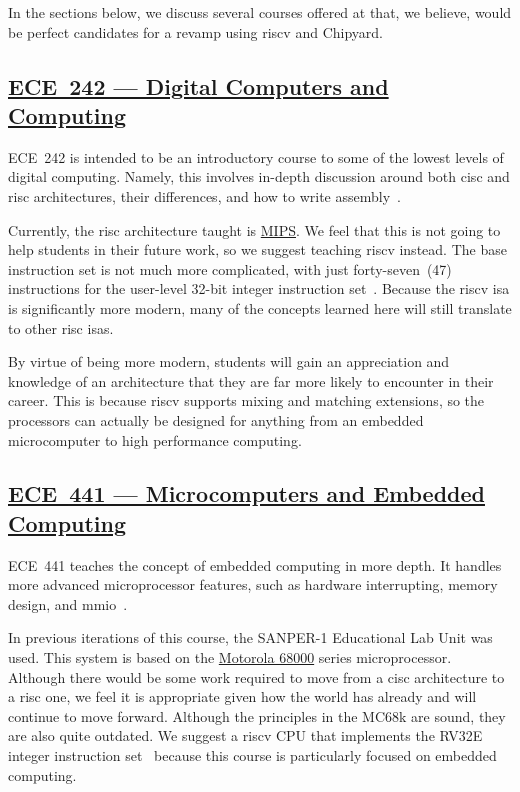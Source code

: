 In the sections below, we discuss several courses offered at \IIT{} that, we believe, would be perfect candidates for a revamp using \Gls{riscv} and Chipyard.

\subsection{\href{http://bulletin.iit.edu/search/?P=ECE 242}{ECE~242 --- Digital Computers and Computing}}\label{sec:ECE_242}
ECE~242 is intended to be an introductory course to some of the lowest levels of digital computing.
Namely, this involves in-depth discussion around both \Gls{cisc} and \Gls{risc} architectures, their differences, and how to write \gls{assembly}~\cite{iitECE242}.

Currently, the \Gls{risc} architecture taught is \href{https://en.wikipedia.org/wiki/MIPS_architecture}{MIPS}.
We feel that this is not going to help students in their future work, so we suggest teaching \Gls{riscv} instead.
The base instruction set is not much more complicated, with just forty-seven~(47) instructions for the user-level 32-bit integer instruction set~\cite[pp.~9--26]{riscvISASpec}.
Because the \Gls{riscv} \Gls{isa} is significantly more modern, many of the concepts learned here will still translate to other \Gls{risc} \Glspl{isa}.

By virtue of being more modern, students will gain an appreciation and knowledge of an architecture that they are far more likely to encounter in their career.
This is because \Gls{riscv} supports mixing and matching extensions, so the processors can actually be designed for anything from an embedded microcomputer to high performance computing.

\subsection{\href{http://bulletin.iit.edu/search/?P=ECE 441}{ECE~441 --- Microcomputers and Embedded Computing}}\label{sec:ECE_441}
ECE~441 teaches the concept of embedded computing in more depth.
It handles more advanced microprocessor features, such as hardware interrupting, memory design, and \Gls{mmio}~\cite{iitECE441}.

In previous iterations of this course, the SANPER-1 Educational Lab Unit was used.
This system is based on the \href{https://en.wikipedia.org/wiki/Motorola_68000}{Motorola 68000} series microprocessor.
Although there would be some work required to move from a \Gls{cisc} architecture to a \Gls{risc} one, we feel it is appropriate given how the world has already and will continue to move forward.
Although the principles in the MC68k are sound, they are also quite outdated.
We suggest a \Gls{riscv} CPU that implements the RV32E integer instruction set~\cite[p.~25]{riscvISASpec} because this course is particularly focused on embedded computing.

